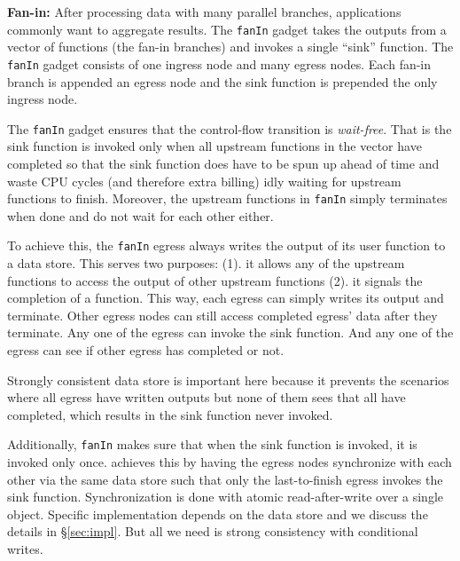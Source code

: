

\noindent\textbf{Fan-in:} After processing data with many parallel branches, applications commonly want
to aggregate results. The \texttt{fanIn} gadget takes the outputs from a vector of
functions (the fan-in branches) and invokes a single ``sink'' function. The
\texttt{fanIn} gadget consists of one ingress node and many egress nodes. Each
fan-in branch is appended an egress node and the sink function is prepended
the only ingress node.

%


The \texttt{fanIn} gadget ensures that the control-flow transition is
\emph{wait-free}. That is the sink function is invoked only when all upstream
functions in the vector have completed so that the sink function does have to
be spun up ahead of time and waste CPU cycles (and therefore extra billing)
idly waiting for upstream functions to finish. Moreover, the upstream
functions in \texttt{fanIn} simply terminates when done and do not wait for
each other either.

To achieve this, the \texttt{fanIn} egress always writes the output of its
user function to a data store. This serves two purposes: (1). it allows any of
the upstream functions to access the output of other upstream functions (2).
it signals the completion of a function. This way, each egress can simply
writes its output and terminate. Other egress nodes can still access completed
egress' data after they terminate. Any one of the egress can invoke the sink
function. And any one of the egress can see if other egress has completed or
not. 

Strongly consistent data store is important here because it prevents the
scenarios where all egress have written outputs but none of them sees that all
have completed, which results in the sink function never invoked.

Additionally, \texttt{fanIn} makes sure that when the sink function is
invoked, it is invoked only once. \name{} achieves this by having the egress
nodes synchronize with each other via the same data store such that only the
last-to-finish egress invokes the sink function. Synchronization is done with
atomic read-after-write over a single object. Specific implementation depends
on the data store and we discuss the details in \S\ref{sec:impl}. But all we
need is strong consistency with conditional writes.


